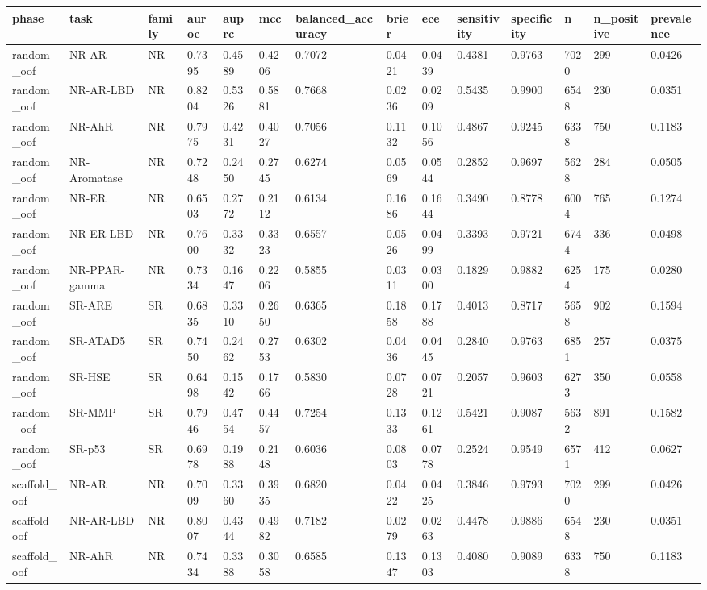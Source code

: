 \begin{tabular}{llllllllllllll}
\hline
phase & task & family & auroc & auprc & mcc & balanced\_accuracy & brier & ece & sensitivity & specificity & n & n\_positive & prevalence \\
\hline
random\_oof & NR-AR & NR & 0.7395 & 0.4589 & 0.4206 & 0.7072 & 0.0421 & 0.0439 & 0.4381 & 0.9763 & 7020 & 299 & 0.0426 \\
random\_oof & NR-AR-LBD & NR & 0.8204 & 0.5326 & 0.5881 & 0.7668 & 0.0236 & 0.0209 & 0.5435 & 0.9900 & 6548 & 230 & 0.0351 \\
random\_oof & NR-AhR & NR & 0.7975 & 0.4231 & 0.4027 & 0.7056 & 0.1132 & 0.1056 & 0.4867 & 0.9245 & 6338 & 750 & 0.1183 \\
random\_oof & NR-Aromatase & NR & 0.7248 & 0.2450 & 0.2745 & 0.6274 & 0.0569 & 0.0544 & 0.2852 & 0.9697 & 5628 & 284 & 0.0505 \\
random\_oof & NR-ER & NR & 0.6503 & 0.2772 & 0.2112 & 0.6134 & 0.1686 & 0.1644 & 0.3490 & 0.8778 & 6004 & 765 & 0.1274 \\
random\_oof & NR-ER-LBD & NR & 0.7600 & 0.3332 & 0.3323 & 0.6557 & 0.0526 & 0.0499 & 0.3393 & 0.9721 & 6744 & 336 & 0.0498 \\
random\_oof & NR-PPAR-gamma & NR & 0.7334 & 0.1647 & 0.2206 & 0.5855 & 0.0311 & 0.0300 & 0.1829 & 0.9882 & 6254 & 175 & 0.0280 \\
random\_oof & SR-ARE & SR & 0.6835 & 0.3310 & 0.2650 & 0.6365 & 0.1858 & 0.1788 & 0.4013 & 0.8717 & 5658 & 902 & 0.1594 \\
random\_oof & SR-ATAD5 & SR & 0.7450 & 0.2462 & 0.2753 & 0.6302 & 0.0436 & 0.0445 & 0.2840 & 0.9763 & 6851 & 257 & 0.0375 \\
random\_oof & SR-HSE & SR & 0.6498 & 0.1542 & 0.1766 & 0.5830 & 0.0728 & 0.0721 & 0.2057 & 0.9603 & 6273 & 350 & 0.0558 \\
random\_oof & SR-MMP & SR & 0.7946 & 0.4754 & 0.4457 & 0.7254 & 0.1333 & 0.1261 & 0.5421 & 0.9087 & 5632 & 891 & 0.1582 \\
random\_oof & SR-p53 & SR & 0.6978 & 0.1988 & 0.2148 & 0.6036 & 0.0803 & 0.0778 & 0.2524 & 0.9549 & 6571 & 412 & 0.0627 \\
scaffold\_oof & NR-AR & NR & 0.7009 & 0.3360 & 0.3935 & 0.6820 & 0.0422 & 0.0425 & 0.3846 & 0.9793 & 7020 & 299 & 0.0426 \\
scaffold\_oof & NR-AR-LBD & NR & 0.8007 & 0.4344 & 0.4982 & 0.7182 & 0.0279 & 0.0263 & 0.4478 & 0.9886 & 6548 & 230 & 0.0351 \\
scaffold\_oof & NR-AhR & NR & 0.7434 & 0.3388 & 0.3058 & 0.6585 & 0.1347 & 0.1303 & 0.4080 & 0.9089 & 6338 & 750 & 0.1183 \\

\end{tabular}
